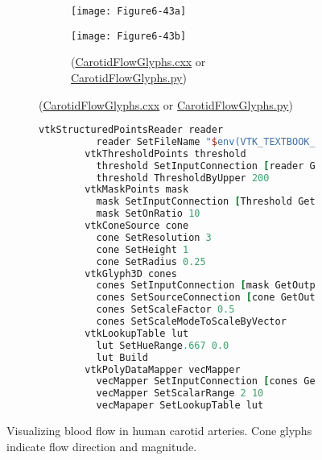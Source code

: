 \begin{figure}[!htb]
    \centering
    \begin{subfigure}[h]{0.96\linewidth}
    	\begin{subfigure}[h]{0.48\linewidth}
    		\texttt{[image: Figure6-43a]}
    		\caption*{}
    		\label{fig:Figure6-43a}
    	\end{subfigure}
    	\hfill
    	\begin{subfigure}[h]{0.48\linewidth}
    		\texttt{[image: Figure6-43b]}
    		\caption*{(\href{https://lorensen.github.io/VTKExamples/site/Cxx/VisualizationAlgorithms/CarotidFlowGlyphs/}{CarotidFlowGlyphs.cxx} or \href{https://lorensen.github.io/VTKExamples/site/Python/VisualizationAlgorithms/CarotidFlowGlyphs/}{CarotidFlowGlyphs.py})}
    		\label{fig:Figure6-43b}
    	\end{subfigure}
	\end{subfigure}
	\hfill
	\begin{subfigure}[h]{0.76\linewidth}
		\begin{lstlisting}[language=TCL, caption={}]
		vtkStructuredPointsReader reader
		  reader SetFileName "$env(VTK_TEXTBOOK_DATA)/carotid.vtk"
		vtkThresholdPoints threshold
		  threshold SetInputConnection [reader GetOutputPort]
		  threshold ThresholdByUpper 200
		vtkMaskPoints mask
		  mask SetInputConnection [Threshold GetOutputPort]
		  mask SetOnRatio 10
		vtkConeSource cone
		  cone SetResolution 3
		  cone SetHeight 1
		  cone SetRadius 0.25
		vtkGlyph3D cones
		  cones SetInputConnection [mask GetOutputPort]
		  cones SetSourceConnection [cone GetOutputPort]
		  cones SetScaleFactor 0.5
		  cones SetScaleModeToScaleByVector
		vtkLookupTable lut
		  lut SetHueRange.667 0.0
		  lut Build
		vtkPolyDataMapper vecMapper
		  vecMapper SetInputConnection [cones GetOutputPort]
		  vecMapper SetScalarRange 2 10
		  vecMapaper SetLookupTable lut
		\end{lstlisting}
		\caption*{}
		\label{fig:Figure6-43c}
	\end{subfigure}
	\caption{Visualizing blood flow in human carotid arteries. Cone glyphs indicate flow direction and magnitude.}\label{fig:Figure6-43}
\end{figure}

